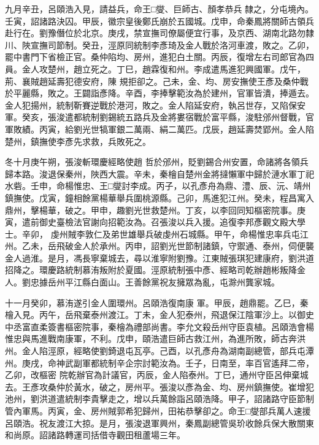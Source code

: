 \begin{pinyinscope}
 九月辛丑，呂頤浩入見，請益兵，命王□燮、巨師古、顏孝恭兵
 隸之，分屯境內。壬寅，詔諸路決囚。甲辰，徽宗皇後鄭氏崩於五國城。戊申，命秦鳳將關師古領兵赴行在。劉豫僭位於北京。庚戌，禁宣撫司僚屬便宜行事，及京西、湖南北路勿隸川、陜宣撫司節制。癸丑，涇原同統制李彥琦及金人戰於洛河車渡，敗之。乙卯，罷中書門下省檢正官。桑仲陷均、房州，進犯白土關。丙辰，復增左右司郎官為四員。金人攻楚州，趙立死之。丁巳，趙霖復和州。李成遣馬進犯興國軍。戊午，荊、襄賊趙延壽犯德安府，陳
 規拒卻之。己未，金、均、房安撫使王彥及桑仲戰於平麗縣，敗之。王闢詣彥降。辛酉，李捧擊範汝為於建州，官軍皆潰，捧遁去。金人犯揚州，統制靳賽逆戰於港河，敗之。金人陷延安府，執呂世存，又陷保安軍。癸亥，張浚遣都統制劉錫統五路兵及金將婁宿戰於富平縣，浚駐邠州督戰，官軍敗績。丙寅，給劉光世犒軍銀二萬兩、絹二萬匹。戊辰，趙延壽焚郢州。金人陷楚州，鎮撫使李彥先求救，兵敗死之。



 冬十月庚午朔，張浚斬環慶經略使趙
 哲於邠州，貶劉錫合州安置，命諸將各領兵歸本路。浚退保秦州，陜西大震。辛未，秦檜自楚州金將撻懶軍中歸於漣水軍丁祀水砦。壬申，命楊惟忠、王□燮討李成。丙子，以孔彥舟為鼎、澧、辰、沅、靖州鎮撫使。戊寅，鐘相餘黨楊華舉兵圍桃源縣。己卯，馬進犯江州。癸未，程昌寓入鼎州，擊楊華，破之。甲申，趣劉光世救楚州。丁亥，以李回同知樞密院事。庚寅，遣前御史臺檢法官謝向招範汝為。召張浚以兵入援。追復李邦彥觀文殿大學士。辛卯，
 虔州賊李敦仁及弟世雄舉兵破虔州石城縣。甲午，命楊惟忠率兵屯江州。乙未，岳飛破金人於承州。丙申，詔劉光世節制諸鎮，守禦通、泰州，伺便襲金人過淮。是月，馮長寧棄城去，尋以淮寧附劉豫。江東賊張琪犯建康府，劉洪道招降之。環慶路統制慕洧叛附於夏國。涇原統制張中彥、經略司乾辦趙彬叛降金人。劉忠據岳州平江縣白面山。王善餘黨祝友擁眾為亂，屯滁州龔家城。



 十一月癸卯，慕洧遂引金人圍環州。呂頤浩復南康
 軍。甲辰，趙鼎罷。乙巳，秦檜入見。丙午，岳飛棄泰州渡江。丁未，金人犯泰州，飛退保江陰軍沙上。以御史中丞富直柔簽書樞密院事，秦檜為禮部尚書。李允文殺岳州守臣袁植。呂頤浩會楊惟忠與馬進戰南康軍，不利。戊申，頤浩遣巨師古救江州，為進所敗，師古奔洪州。金人陷涇原，經略使劉錡退屯瓦亭。己酉，以孔彥舟為湖南副總管，部兵屯潭州。庚戌，命神武副軍都統制辛企宗討範汝為。壬子，日南至，率百官遙拜二帝，乙卯，改樞密
 院乾辦官為計議官，丙辰，金人陷泰州。丁巳，通州守臣呂伸棄城去。王彥攻桑仲於黃水，破之，房州平。張浚以彥為金、均、房州鎮撫使。崔增犯池州，劉洪道遣統制李貴擊走之，增以兵萬餘詣呂頤浩降。甲子，詔諸路守臣節制管內軍馬。丙寅，金、房州賊郭希犯歸州，田祐恭擊卻之。命王□燮部兵萬人速援呂頤浩。祝友渡江大掠。是月，張浚退軍興州，秦鳳副總管吳玠收餘兵保大散關東和尚原。詔諸路轉運司括借寺觀田租蘆場三年。




\end{pinyinscope}
